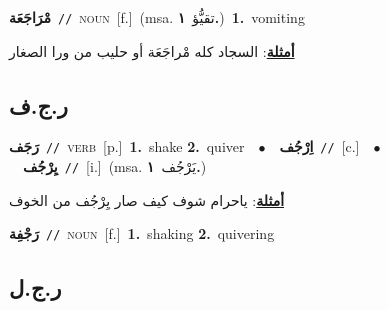 \documentclass[10pt,a4paper,twoside]{article} %
\begin{document}
\begin{multicols}{2}
{\setlength\topsep{0pt}\textbf{\foreignlanguage{arabic}{مْرَاجَعَة}}\ {\color{gray}\texttt{//}\color{black}}\ \textsc{noun}\ [f.]\ \color{gray}(msa. \foreignlanguage{arabic}{تقيُّؤ}~\foreignlanguage{arabic}{\textbf{١.}})\color{black}\ \textbf{1.}~vomiting\  \begin{flushright}\color{gray}\foreignlanguage{arabic}{\textbf{\underline{\foreignlanguage{arabic}{أمثلة}}}: السجاد كله مْراجَعَة أو حليب من ورا الصغار}\end{flushright}\color{black}} \vspace{2mm}

\vspace{-3mm}
\subsection*{\color{blue}\foreignlanguage{arabic}{ر.ج.ف}\color{blue}{}} 

{\setlength\topsep{0pt}\textbf{\foreignlanguage{arabic}{رَجَف}}\ {\color{gray}\texttt{//}\color{black}}\ \textsc{verb}\ [p.]\ \textbf{1.}~shake  \textbf{2.}~quiver\ \ $\bullet$\ \ \setlength\topsep{0pt}\textbf{\foreignlanguage{arabic}{اِرْجُف}}\ {\color{gray}\texttt{//}\color{black}}\ [c.]\ \ $\bullet$\ \ \setlength\topsep{0pt}\textbf{\foreignlanguage{arabic}{يِرْجُف}}\ {\color{gray}\texttt{//}\color{black}}\ [i.]\ \color{gray}(msa. \foreignlanguage{arabic}{يَرْجُف}~\foreignlanguage{arabic}{\textbf{١.}})\color{black}\  \begin{flushright}\color{gray}\foreignlanguage{arabic}{\textbf{\underline{\foreignlanguage{arabic}{أمثلة}}}: ياحرام شوف كيف صار يِرْجُف من الخوف}\end{flushright}\color{black}} \vspace{2mm}

{\setlength\topsep{0pt}\textbf{\foreignlanguage{arabic}{رَجْفِة}}\ {\color{gray}\texttt{//}\color{black}}\ \textsc{noun}\ [f.]\ \textbf{1.}~shaking  \textbf{2.}~quivering\ } \vspace{2mm}

\vspace{-3mm}
\subsection*{\color{blue}\foreignlanguage{arabic}{ر.ج.ل}\color{blue}{}} 


\end{multicols}
\end{document}
